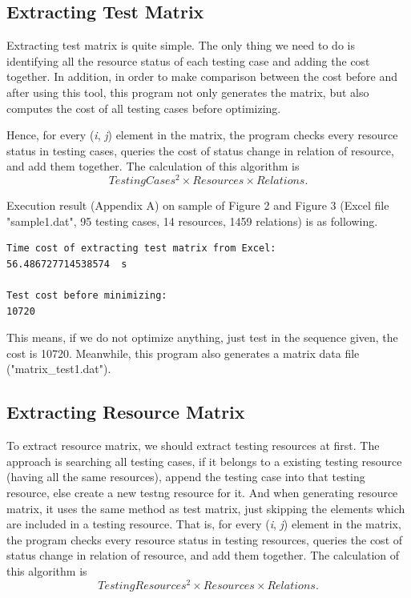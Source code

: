 \documentclass[12pt,a4paper]{article}
\begin{document}
\subsection{Extracting Test Matrix}

Extracting test matrix is quite simple. The only thing we need to do is identifying all the resource status of each testing case and adding the cost together. In addition, in order to make comparison between the cost before and after using this tool, this program not only generates the matrix, but also computes the cost of all testing cases before optimizing.

Hence, for every (\emph{i}, \emph{j}) element in the matrix, the program checks every resource status in testing cases, queries the cost of status change in relation of resource, and add them together. The calculation of this algorithm is $$ TestingCases^2\times Resources\times Relations.$$

Execution result (Appendix A) on sample of Figure 2 and Figure 3 (Excel file "sample1.dat", 95 testing cases, 14 resources, 1459 relations) is as following.

\begin{lstlisting}
Time cost of extracting test matrix from Excel:
56.486727714538574  s

Test cost before minimizing:
10720
\end{lstlisting}

This means, if we do not optimize anything, just test in the sequence given, the cost is 10720.  Meanwhile, this program also generates a matrix data file ("matrix\_test1.dat").

\subsection{Extracting Resource Matrix}

To extract resource matrix, we should extract testing resources at first. The approach is searching all testing cases, if it belongs to a existing testing resource (having all the same resources), append the testing case into that testing resource, else create a new testng resource for it. And when generating resource matrix, it uses the same method as test matrix, just skipping the elements which are included in a testing resource. That is, for every (\emph{i}, \emph{j}) element in the matrix, the program checks every resource status in testing resources, queries the cost of status change in relation of resource, and add them together. The calculation of this algorithm is $$TestingResources^2\times Resources\times Relations.$$ 
\end{document}
